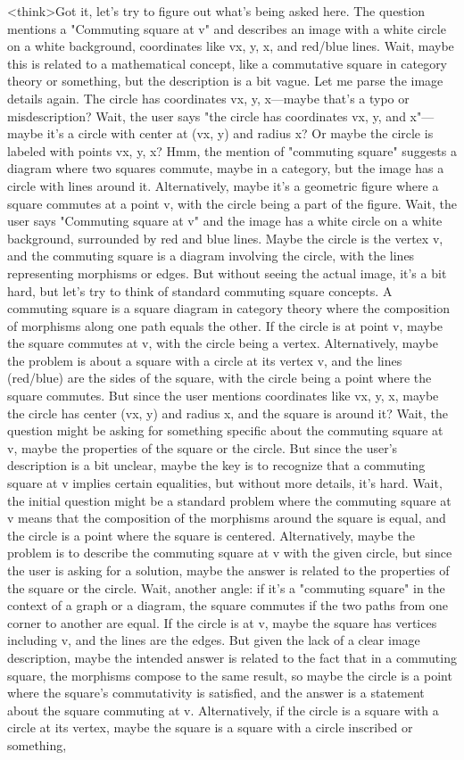 <think>Got it, let's try to figure out what's being asked here. The question mentions a "Commuting square at v" and describes an image with a white circle on a white background, coordinates like vx, y, x, and red/blue lines. Wait, maybe this is related to a mathematical concept, like a commutative square in category theory or something, but the description is a bit vague. Let me parse the image details again. The circle has coordinates vx, y, x—maybe that's a typo or misdescription? Wait, the user says "the circle has coordinates vx, y, and x"—maybe it's a circle with center at (vx, y) and radius x? Or maybe the circle is labeled with points vx, y, x? Hmm, the mention of "commuting square" suggests a diagram where two squares commute, maybe in a category, but the image has a circle with lines around it. Alternatively, maybe it's a geometric figure where a square commutes at a point v, with the circle being a part of the figure. Wait, the user says "Commuting square at v" and the image has a white circle on a white background, surrounded by red and blue lines. Maybe the circle is the vertex v, and the commuting square is a diagram involving the circle, with the lines representing morphisms or edges. But without seeing the actual image, it's a bit hard, but let's try to think of standard commuting square concepts. A commuting square is a square diagram in category theory where the composition of morphisms along one path equals the other. If the circle is at point v, maybe the square commutes at v, with the circle being a vertex. Alternatively, maybe the problem is about a square with a circle at its vertex v, and the lines (red/blue) are the sides of the square, with the circle being a point where the square commutes. But since the user mentions coordinates like vx, y, x, maybe the circle has center (vx, y) and radius x, and the square is around it? Wait, the question might be asking for something specific about the commuting square at v, maybe the properties of the square or the circle. But since the user's description is a bit unclear, maybe the key is to recognize that a commuting square at v implies certain equalities, but without more details, it's hard. Wait, the initial question might be a standard problem where the commuting square at v means that the composition of the morphisms around the square is equal, and the circle is a point where the square is centered. Alternatively, maybe the problem is to describe the commuting square at v with the given circle, but since the user is asking for a solution, maybe the answer is related to the properties of the square or the circle. Wait, another angle: if it's a "commuting square" in the context of a graph or a diagram, the square commutes if the two paths from one corner to another are equal. If the circle is at v, maybe the square has vertices including v, and the lines are the edges. But given the lack of a clear image description, maybe the intended answer is related to the fact that in a commuting square, the morphisms compose to the same result, so maybe the circle is a point where the square's commutativity is satisfied, and the answer is a statement about the square commuting at v. Alternatively, if the circle is a square with a circle at its vertex, maybe the square is a square with a circle inscribed or something, 